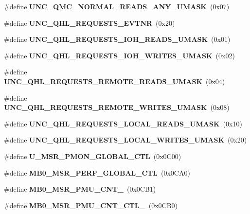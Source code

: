 \begin{DoxyCompactItemize}
\#define {\bfseries U\+N\+C\+\_\+\+Q\+M\+C\+\_\+\+N\+O\+R\+M\+A\+L\+\_\+\+R\+E\+A\+D\+S\+\_\+\+A\+N\+Y\+\_\+\+U\+M\+A\+SK}~(0x07)
\item 
\mbox{\label{types_8h_a73f427253368afcb09bdc9e014beb78b}} 
\#define {\bfseries U\+N\+C\+\_\+\+Q\+H\+L\+\_\+\+R\+E\+Q\+U\+E\+S\+T\+S\+\_\+\+E\+V\+T\+NR}~(0x20)
\item 
\mbox{\label{types_8h_af8e9aeb55fcaf7733e59b551e9f2e78e}} 
\#define {\bfseries U\+N\+C\+\_\+\+Q\+H\+L\+\_\+\+R\+E\+Q\+U\+E\+S\+T\+S\+\_\+\+I\+O\+H\+\_\+\+R\+E\+A\+D\+S\+\_\+\+U\+M\+A\+SK}~(0x01)
\item 
\mbox{\label{types_8h_abe67ec964875ae4eaa22e667cbac2b32}} 
\#define {\bfseries U\+N\+C\+\_\+\+Q\+H\+L\+\_\+\+R\+E\+Q\+U\+E\+S\+T\+S\+\_\+\+I\+O\+H\+\_\+\+W\+R\+I\+T\+E\+S\+\_\+\+U\+M\+A\+SK}~(0x02)
\item 
\mbox{\label{types_8h_a03ea6ce36511244b92f7f28133fddf2d}} 
\#define {\bfseries U\+N\+C\+\_\+\+Q\+H\+L\+\_\+\+R\+E\+Q\+U\+E\+S\+T\+S\+\_\+\+R\+E\+M\+O\+T\+E\+\_\+\+R\+E\+A\+D\+S\+\_\+\+U\+M\+A\+SK}~(0x04)
\item 
\mbox{\label{types_8h_ab0077e2742a89d3f5062e758ad3bea32}} 
\#define {\bfseries U\+N\+C\+\_\+\+Q\+H\+L\+\_\+\+R\+E\+Q\+U\+E\+S\+T\+S\+\_\+\+R\+E\+M\+O\+T\+E\+\_\+\+W\+R\+I\+T\+E\+S\+\_\+\+U\+M\+A\+SK}~(0x08)
\item 
\mbox{\label{types_8h_aa49807e82cc1bb3a4f4d183ca67f3d07}} 
\#define {\bfseries U\+N\+C\+\_\+\+Q\+H\+L\+\_\+\+R\+E\+Q\+U\+E\+S\+T\+S\+\_\+\+L\+O\+C\+A\+L\+\_\+\+R\+E\+A\+D\+S\+\_\+\+U\+M\+A\+SK}~(0x10)
\item 
\mbox{\label{types_8h_a03c56b60d268ae31c7d5c3186dd9eca1}} 
\#define {\bfseries U\+N\+C\+\_\+\+Q\+H\+L\+\_\+\+R\+E\+Q\+U\+E\+S\+T\+S\+\_\+\+L\+O\+C\+A\+L\+\_\+\+W\+R\+I\+T\+E\+S\+\_\+\+U\+M\+A\+SK}~(0x20)
\item 
\mbox{\label{types_8h_a1c69439681fa91a8823350ce9ad91262}} 
\#define {\bfseries U\+\_\+\+M\+S\+R\+\_\+\+P\+M\+O\+N\+\_\+\+G\+L\+O\+B\+A\+L\+\_\+\+C\+TL}~(0x0\+C00)
\item 
\mbox{\label{types_8h_a00d8e56a55456b4f7eaa0721e3a92554}} 
\#define {\bfseries M\+B0\+\_\+\+M\+S\+R\+\_\+\+P\+E\+R\+F\+\_\+\+G\+L\+O\+B\+A\+L\+\_\+\+C\+TL}~(0x0\+C\+A0)
\item 
\mbox{\label{types_8h_af5040cf21905f48c937b0136ec430913}} 
\#define {\bfseries M\+B0\+\_\+\+M\+S\+R\+\_\+\+P\+M\+U\+\_\+\+C\+N\+T\+\_}~(0x0\+C\+B1)
\item 
\mbox{\label{types_8h_ae4a0e1983c4493471b78c7b3d4bc7f46}} 
\#define {\bfseries M\+B0\+\_\+\+M\+S\+R\+\_\+\+P\+M\+U\+\_\+\+C\+N\+T\+\_\+\+C\+T\+L\+\_}~(0x0\+C\+B0)

\end{DoxyCompactItemize}
